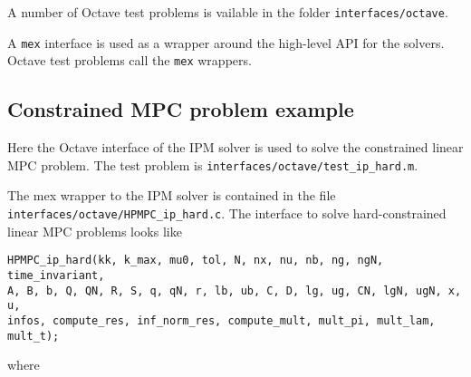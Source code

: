 \documentclass[a4paper]{report}
\begin{document}
A number of Octave test problems is vailable in the folder {\tt interfaces/octave}.

A {\tt mex} interface is used as a wrapper around the high-level API for the solvers.
Octave test problems call the {\tt mex} wrappers.

\subsection{Constrained MPC problem example}

Here the Octave interface of the IPM solver is used to solve the constrained linear MPC problem.
The test problem is {\tt interfaces/octave/test\_ip\_hard.m}.

The mex wrapper to the IPM solver is contained in the file {\tt interfaces/octave/HPMPC\_ip\_hard.c}.
The interface to solve hard-constrained linear MPC problems looks like
\begin{verbatim}
HPMPC_ip_hard(kk, k_max, mu0, tol, N, nx, nu, nb, ng, ngN, time_invariant, 
A, B, b, Q, QN, R, S, q, qN, r, lb, ub, C, D, lg, ug, CN, lgN, ugN, x, u, 
infos, compute_res, inf_norm_res, compute_mult, mult_pi, mult_lam, mult_t);
\end{verbatim}
where
\end{document}
